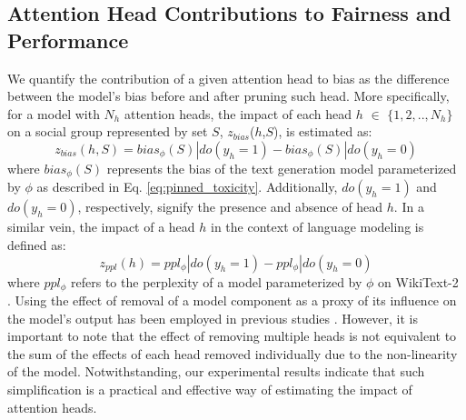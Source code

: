 \documentclass[letterpaper]{article} %
\newcommand{\goncalo}[1]
{\textcolor{orange}{{\bf}{\em #1}{\bf}}}
\begin{document}
\subsection{Attention Head Contributions to Fairness and Performance}
We quantify the contribution of a given attention head to bias as the difference between the model’s bias before and after pruning such head. More specifically, for a model with $N_h$ attention heads, the impact of each head $h$ $\in$ $\{1, 2, .., N_h\}$ on a social group represented by set $S$, $z_{bias}$($h$,$S$), is estimated as:
\begin{equation}
z_{bias}(h,S) = bias_{\phi}(S)|do(y_h = 1) - bias_{\phi}(S)|do(y_h = 0)
\label{eq:ATE_bias}
\end{equation}
where $bias_{\phi}(S)$ represents the bias of the text generation model parameterized by $\phi$ as described in Eq. \eqref{eq:pinned_toxicity}. Additionally, $do(y_h = 1)$ and $do(y_h = 0)$, respectively, signify the presence and absence of head $h$.
In a similar vein, the impact of a head $h$ in the context of language modeling is defined as:
\begin{equation}
z_{ppl}(h) = ppl_{\phi}|do(y_h = 1) - ppl_{\phi}|do(y_h = 0)
\label{eq:ATE_perf}
\end{equation}
where $ppl_{\phi}$ refers to the perplexity of a model parameterized by $\phi$ on WikiText-2 \cite{meritypointer}.
Using the effect of removal of a model component as a proxy of its influence on the model's output has been employed in previous studies \cite{rotman2021model}.
However, it is important to note that the effect of removing multiple heads is not equivalent to the sum of the effects of each head removed individually due to the non-linearity of the model. %
Notwithstanding, our experimental results indicate that such simplification is a practical and effective way of estimating the impact of attention heads.


\end{document}
